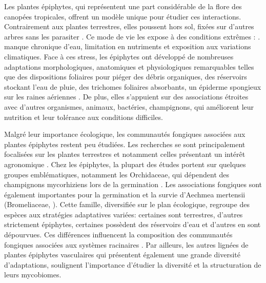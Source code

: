 \documentclass[a4paper,12pt]{article}
\begin{document}
Les plantes épiphytes,  qui  représentent une part considérable de la flore des canopées tropicales, offrent un modèle unique pour étudier ces interactions.  Contrairement aux plantes terrestres, elles  poussent hors sol, fixées sur d’autres arbres sans les parasiter \citep{zotz_plants_2016}. Ce mode de vie les expose à des conditions extrêmes : . manque chronique d’eau, limitation en nutriments et exposition aux variations climatiques. Face à ces stress, les épiphytes ont développé de nombreuses adaptations morphologiques, anatomiques et physiologiques remarquables telles que des dispositions foliaires pour piéger des débris organiques, des réservoirs stockant l’eau de pluie, des trichomes foliaires absorbants, un épiderme spongieux sur les raines aériennes \citep{benzing2008vascular} . De plus, elles s’appuient sur des associations étroites avec d’autres organismes, animaux, bactéries, champignons, qui améliorent leur nutrition et leur tolérance aux conditions difficiles. 

Malgré leur importance écologique, les communautés fongiques associées aux plantes épiphytes  restent peu étudiées. Les recherches se sont principalement focalisées sur les plantes terrestres et  notamment celles présentant  un intérêt agronomique \citep{vega_fungal_2008}. Chez les épiphytes, la plupart des études portent sur quelques groupes emblématiques, notamment les Orchidaceae, qui  dépendent des champignons mycorhiziens lors de la germination \citep{martos2009independent}. Les associations fongiques sont également importantes pour la germination et la survie d’Aechmea mertensii (Bromeliaceae, \citep{leroy2019significant}). Cette famille, diversifiée sur le plan écologique, regroupe des espèces aux stratégies adaptatives variées: certaines sont terrestres, d’autres strictement épiphytes, certaines possèdent des réservoirs d’eau et d’autres en sont dépourvues. Ces différences influencent la composition des communautés fongiques associées aux systèmes racinaires \citep{leroy2021taxonomic}. Par ailleurs, les autres lignées de plantes épiphytes vasculaires qui présentent également une grande diversité d’adaptations, soulignent l’importance d’étudier la diversité et la structuration de leurs mycobiomes.
\end{document}
